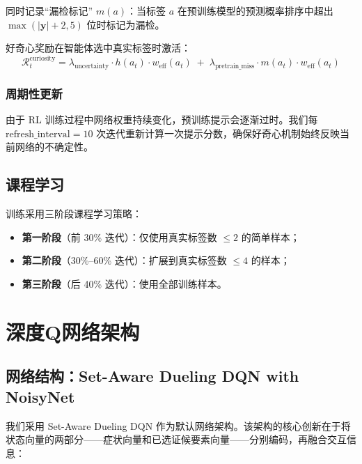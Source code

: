 \documentclass[12pt,a4paper]{article}
\newcommand{\reward}{\mathcal{R}}
\newcommand{\trueSE}{\mathbf{y}}
\begin{document}
同时记录``漏检标记'' $m(a)$：当标签 $a$ 在预训练模型的预测概率排序中超出 $\max(|\trueSE|+2, 5)$ 位时标记为漏检。

好奇心奖励在智能体选中真实标签时激活：
\begin{equation}
    \reward_t^{\text{curiosity}} = \lambda_{\text{uncertainty}} \cdot h(a_t) \cdot w_{\text{eff}}(a_t) \;+\; \lambda_{\text{pretrain\_miss}} \cdot m(a_t) \cdot w_{\text{eff}}(a_t)
\end{equation}

\subsubsection{周期性更新}

由于 RL 训练过程中网络权重持续变化，预训练提示会逐渐过时。我们每 $\text{refresh\_interval}=10$ 次迭代重新计算一次提示分数，确保好奇心机制始终反映当前网络的不确定性。

\subsection{课程学习}

训练采用三阶段课程学习策略：
\begin{itemize}
    \item \textbf{第一阶段}（前 30\% 迭代）：仅使用真实标签数 $\leq 2$ 的简单样本；
    \item \textbf{第二阶段}（30\%--60\% 迭代）：扩展到真实标签数 $\leq 4$ 的样本；
    \item \textbf{第三阶段}（后 40\% 迭代）：使用全部训练样本。
\end{itemize}

\section{深度Q网络架构}

\subsection{网络结构：Set-Aware Dueling DQN with NoisyNet}

我们采用 Set-Aware Dueling DQN 作为默认网络架构。该架构的核心创新在于将状态向量的两部分——症状向量和已选证候要素向量——分别编码，再融合交互信息：
\end{document}
